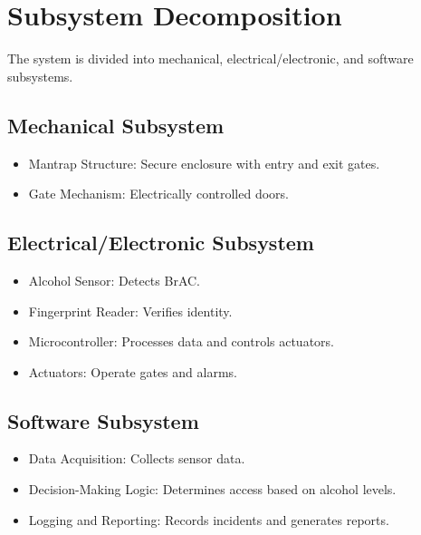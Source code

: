 \documentclass[12pt]{article}
\begin{document}
    \section{Subsystem Decomposition}
    \label{sec:subsystem_decomposition}
    The system is divided into mechanical, electrical/electronic, and software subsystems.

    \subsection{Mechanical Subsystem}
    \begin{itemize}
        \item Mantrap Structure: Secure enclosure with entry and exit gates.
        \item Gate Mechanism: Electrically controlled doors.
    \end{itemize}

    \subsection{Electrical/Electronic Subsystem}
    \begin{itemize}
        \item Alcohol Sensor: Detects BrAC.
        \item Fingerprint Reader: Verifies identity.
        \item Microcontroller: Processes data and controls actuators.
        \item Actuators: Operate gates and alarms.
    \end{itemize}

    \subsection{Software Subsystem}
    \begin{itemize}
        \item Data Acquisition: Collects sensor data.
        \item Decision-Making Logic: Determines access based on alcohol levels.
        \item Logging and Reporting: Records incidents and generates reports.
    \end{itemize}

\end{document}
